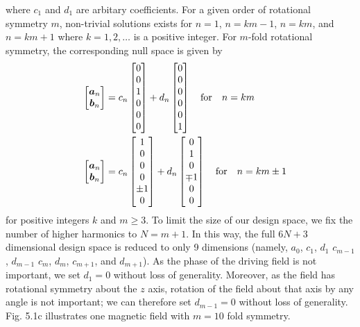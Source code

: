 where $c_1$ and $d_1$ are arbitary coefficients. For a given order of rotational symmetry $m$, non-trivial solutions exists for $n=1$, $n=k m-1$, $n=k m$, and $n=k m + 1$  where $k= 1,2,\dots$ is a positive integer. For $m$-fold rotational symmetry, the corresponding null space is given by
\begin{align}
    \quad \begin{bmatrix} \boldsymbol{a}_{n} \\ \boldsymbol{b}_{n} \end{bmatrix} &= c_{n} \begin{bmatrix} 0\\0\\1\\0\\0\\0 \end{bmatrix} + d_{n} \begin{bmatrix} 0\\0\\0\\0\\0\\1 \end{bmatrix} \quad \text{for} \quad n=km
    \\
    \quad \begin{bmatrix} \boldsymbol{a}_{n} \\ \boldsymbol{b}_{n} \end{bmatrix} &= c_{n} \begin{bmatrix} 1\\0\\0\\0\\\pm1\\0 \end{bmatrix} + d_{n} \begin{bmatrix} 0\\1\\0\\\mp1\\0\\0 \end{bmatrix} \quad \text{for} \quad n=km \pm 1
\end{align}
for positive integers $k$ and $m\geq3$. To limit the size of our design space, we fix the number of higher harmonics to $N=m+1$. In this way, the full $6N+3$ dimensional design space is reduced to only 9 dimensions (namely, $a_0$, $c_1$, $d_1$ $c_{m-1}$, $d_{m-1}$ $c_{m}$, $d_{m}$, $c_{m+1}$, and $d_{m+1}$). As the phase of the driving field is not important, we set $d_1=0$ without loss of generality.  Moreover, as the field has rotational symmetry about the $z$ axis, rotation of the field about that axis by any angle is not important; we can therefore set $d_{m-1}=0$ without loss of generality.  Fig. 5.1c illustrates one magnetic field with $m=10$ fold symmetry.


